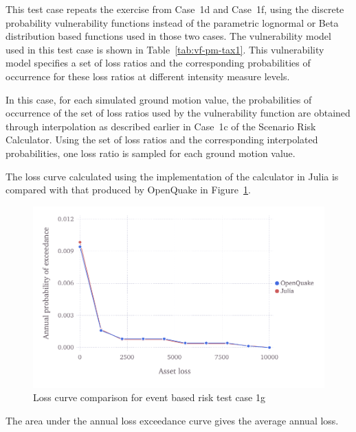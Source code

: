 This test case repeats the exercise from Case~1d and Case~1f, using the discrete probability vulnerability functions instead of the parametric lognormal or Beta distribution based functions used in those two cases. The vulnerability model used in this test case is shown in Table~\ref{tab:vf-pm-tax1}. This vulnerability model specifies a set of loss ratios and the corresponding probabilities of occurrence for these loss ratios at different intensity measure levels.

In this case, for each simulated ground motion value, the probabilities of occurrence of the set of loss ratios used by the vulnerability function are obtained through interpolation as described earlier in Case~1c of the Scenario Risk Calculator. Using the set of loss ratios and the corresponding interpolated probabilities, one loss ratio is sampled for each ground motion value.

The loss curve calculated using the implementation of the calculator in Julia is compared with that produced by OpenQuake in Figure~\ref{fig:lc-ebr-1g}.

\begin{figure}[htbp]
\centering
\includegraphics[width=12cm]{qareport/figures/fig-lc-ebr-1g}
\caption{Loss curve comparison for event based risk test case 1g}
\label{fig:lc-ebr-1g}
\end{figure}

The area under the annual loss exceedance curve gives the average annual loss.